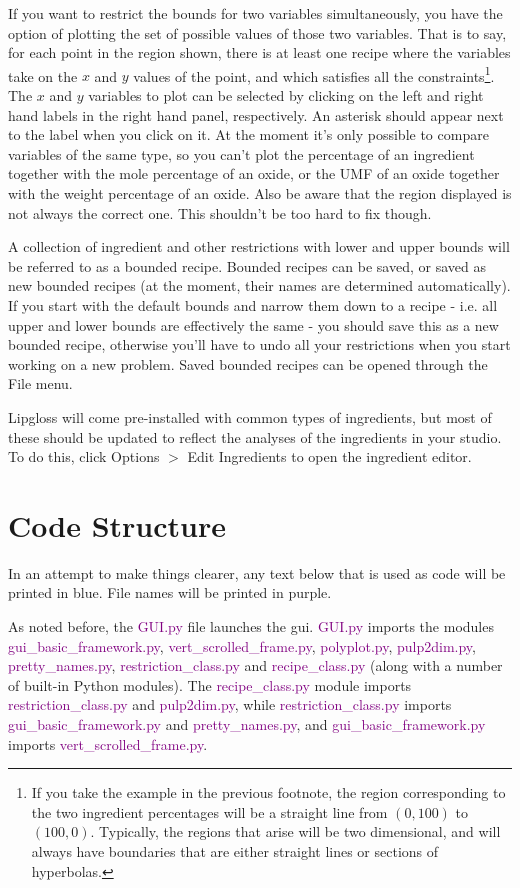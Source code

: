 \documentclass[a4paper,10pt]{article}
\def\green{\textcolor{Purple}}
\begin{document}
If you want to restrict the bounds for two variables simultaneously, you have the option of plotting the set of possible values of those two variables. That is to say, for each point in the region shown, there is at least one recipe where the variables take on the $x$ and $y$ values of the point, and which satisfies all the constraints\footnote{If you take the example in the previous footnote, the region corresponding to the two ingredient percentages will be a straight line from $(0,100)$ to $(100,0)$. Typically, the regions that arise will be two dimensional, and will always have boundaries that are either straight lines or sections of hyperbolas.}. The $x$ and $y$ variables to plot can be selected by clicking on the left and right hand labels in the right hand panel, respectively. An asterisk should appear next to the label when you click on it. At the moment it's only possible to compare variables of the same type, so you can't plot the percentage of an ingredient together with the mole percentage of an oxide, or the UMF of an oxide together with the weight percentage of an oxide. Also be aware that the region displayed is not always the correct one. This shouldn't be too hard to fix though.

A collection of ingredient and other restrictions with lower and upper bounds will be referred to as a bounded recipe. Bounded recipes can be saved, or saved as new bounded recipes (at the moment, their names are determined automatically). If you start with the default bounds and narrow them down to a recipe - i.e. all upper and lower bounds are effectively the same - you should save this as a new bounded recipe, otherwise you'll have to undo all your restrictions when you start working on a new problem. Saved bounded recipes can be opened through the File menu.

Lipgloss will come pre-installed with common types of ingredients, but most of these should be updated to reflect the analyses of the ingredients in your studio. To do this, click Options $>$ Edit Ingredients to open the ingredient editor.

\section{Code Structure}
In an attempt to make things clearer, any text below that is used as code will be printed in blue. File names will be printed in purple.

As noted before, the \green{GUI.py} file launches the gui. \green{GUI.py} imports the modules \green{gui\_basic\_framework.py}, \green{vert\_scrolled\_frame.py}, \green{polyplot.py}, \newline
\green{pulp2dim.py}, \green{pretty\_names.py}, \green{restriction\_class.py} and \green{recipe\_class.py} (along with a number of built-in Python modules). The \green{recipe\_class.py} module imports \green{restriction\_class.py} and \green{pulp2dim.py}, while \green{restriction\_class.py} imports \green{gui\_basic\_framework.py} and \green{pretty\_names.py}, and \green{gui\_basic\_framework.py} imports \green{vert\_scrolled\_frame.py}.
\end{document}
